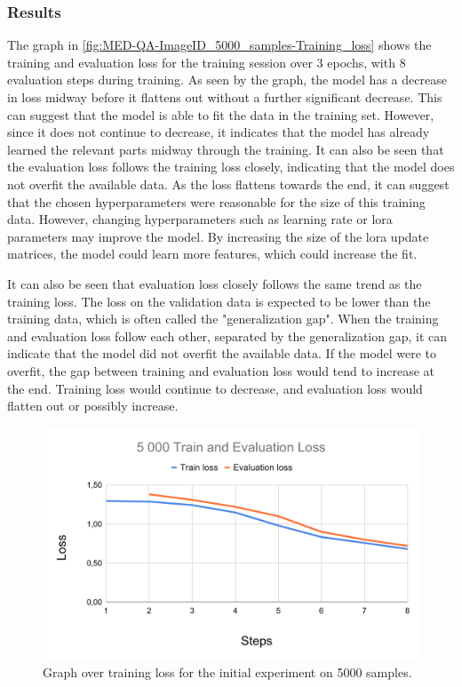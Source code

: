     \subsubsection{Results}


    The graph in \autoref{fig:MED-QA-ImageID_5000_samples-Training_loss} shows the training and evaluation loss for the training session over 3 epochs, with 8 evaluation steps during training. As seen by the graph, the model has a decrease in loss midway before it flattens out without a further significant decrease. This can suggest that the model is able to fit the data in the training set. However, since it does not continue to decrease, it indicates that the model has already learned the relevant parts midway through the training. It can also be seen that the evaluation loss follows the training loss closely, indicating that the model does not overfit the available data. As the loss flattens towards the end, it can suggest that the chosen hyperparameters were reasonable for the size of this training data. 
    However, changing hyperparameters such as learning rate or \gls{lora} parameters may improve the model. By increasing the size of the \gls{lora} update matrices, the model could learn more features, which could increase the fit.

    It can also be seen that evaluation loss closely follows the same trend as the training loss. The loss on the validation data is expected to be lower than the training data, which is often called the "generalization gap". When the training and evaluation loss follow each other, separated by the generalization gap, it can indicate that the model did not overfit the available data. If the model were to overfit, the gap between training and evaluation loss would tend to increase at the end. Training loss would continue to decrease, and evaluation loss would flatten out or possibly increase. 
    
    
    \begin{figure}[htb]
        \centering
        \includegraphics[width=\linewidth]{images/MED-QA-ImageID_5000_samples-Training_loss}
        \caption{Graph over training loss for the initial experiment on 5000 samples.}
        \label{fig:MED-QA-ImageID_5000_samples-Training_loss}
    \end{figure} 


